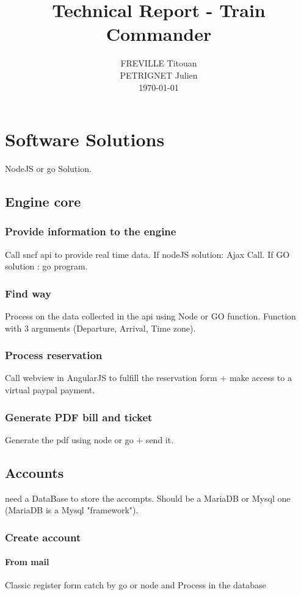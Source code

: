 \documentclass[a4paper,10pt]{report}
\title{Technical Report - Train Commander}
\author{
  FREVILLE Titouan \\
  PETRIGNET Julien \\
  \today
}
\begin{document}
\maketitle
\tableofcontents
\begin{abstract}
\end{abstract}

\part{Software Solutions}
  NodeJS or go Solution.
  \chapter{Engine core}
    \section{Provide information to the engine}
      Call sncf api to provide real time data. If nodeJS solution: Ajax Call. If GO solution : go program.
    \section{Find way}
      Process on the data collected in the api using Node or GO function. Function with 3 arguments (Departure, Arrival, Time zone).
    \section{Process reservation}
      Call webview in AngularJS to fulfill the reservation form + make access to a virtual paypal payment.
    \section{Generate PDF bill and ticket}
      Generate the pdf using node or go + send it.
  \chapter{Accounts}
    need a DataBase to store the accompts. Should be a MariaDB or Mysql one (MariaDB is a Mysql "framework").
    \section{Create account}
      \subsection{From mail}
	Classic register form catch by go or node and Process in the database
\end{document}
